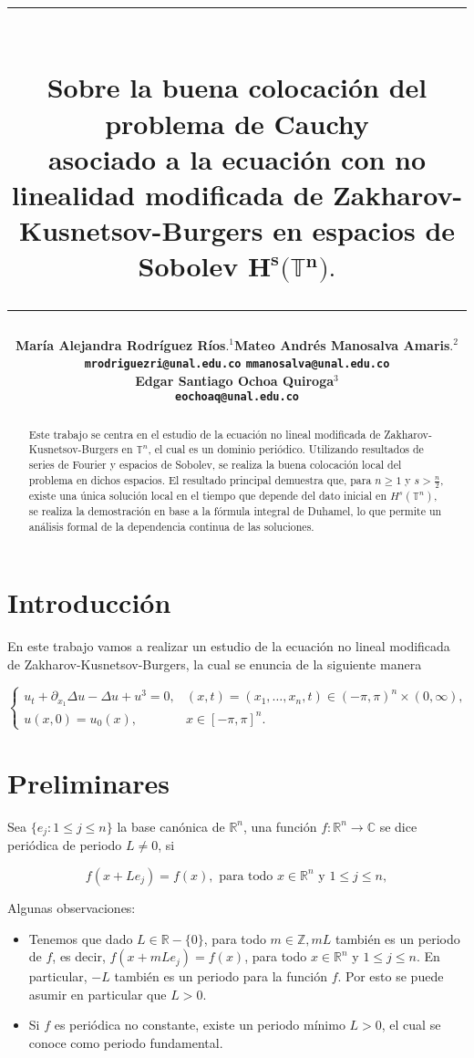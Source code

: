 \documentclass[12pt]{article}
\title{\vspace{-2cm}\par\noindent\rule{16cm}{1pt}\large
\\\bfseries Sobre la buena colocación del problema de Cauchy \\
asociado a la ecuación con no linealidad modificada de Zakharov-Kusnetsov-Burgers en espacios de Sobolev $\mathbf{H^s}\pmb{(}\pmb{\mathbb{T}}\mathbf{^n}\pmb{)}.$
\vspace{-0.34cm}\par\noindent\hspace{0.15cm}\rule{16cm}{1pt}
\vspace{-0.6cm}
}
\author{\small \bfseries María Alejandra Rodríguez Ríos$.^1$\quad \quad\small Mateo Andrés Manosalva Amaris$.^{2}$\\ \small \quad \texttt{mrodriguezri@unal.edu.co} \quad \quad \quad \quad \quad \quad \texttt{mmanosalva@unal.edu.co}\quad\quad \quad\\ \small \bfseries Edgar Santiago Ochoa Quiroga$^{3}$\\
\small \texttt{eochoaq@unal.edu.co}
}
\newcommand\R{\ensuremath{\mathbb{R}}}
\newcommand\T{\mathbb{T}}
\begin{document}
\maketitle
\begin{abstract}
Este trabajo se centra en el estudio de la ecuación no lineal modificada de Zakharov-Kusnetsov-Burgers en $\T^n$, el cual es un dominio periódico. Utilizando resultados de series de Fourier y espacios de Sobolev, se realiza la buena colocación local del problema en dichos espacios. El resultado principal demuestra que, para $n \geq 1$ y $s > \frac{n}{2}$, existe una única solución local en el tiempo que depende del dato inicial en $H^s(\mathbb{T}^n)$, se realiza la demostración en base a la fórmula integral de Duhamel, lo que permite un análisis formal de la dependencia continua de las soluciones.
\end{abstract}

\section{Introducción}
En este trabajo vamos a realizar un estudio de la ecuación no lineal modificada de Zakharov-Kusnetsov-Burgers, la cual se enuncia de la siguiente manera

$$
\left\lbrace
\begin{array}{ll} 
    u_t + \partial_{x_1} \Delta u - \Delta u + u^3 = 0, & (x,t) = (x_1, \dots, x_n, t) \in (-\pi, \pi)^n \times (0, \infty), \\[10pt]
    u(x, 0) = u_0(x), & x \in [-\pi, \pi]^n.
\end{array}
\right.
$$

      


\section{Preliminares}

\begin{definition}
 Sea $\{e_j:  1\leq j\leq n\}$ la base canónica de $\R^n$, una función $f: \mathbb{R}^n \rightarrow \mathbb{C}$ se dice periódica de periodo $L \neq 0$, si

$$
f(x+L e_j)=f(x), \text { para todo } x \in \mathbb{R}^n \text{ y } 1\leq j\leq n, 
$$


\end{definition}

Algunas observaciones:
\begin{itemize}
    \item  Tenemos que dado $L\in \R-\{0\}$, para todo $m \in \mathbb{Z}, m L$ también es un periodo de $f$, es  decir, $f(x+m L e_j)=f(x)$, para todo $x \in \mathbb{R}^n $ y $1\leq j\leq n$. En particular, $-L$ también es un periodo para la función $f$. Por esto se puede asumir en particular que $L>0$.
    
    \item Si $f$ es periódica no constante, existe un periodo mínimo $L>0$, el cual se conoce como periodo fundamental.
\end{itemize}
\end{document}
